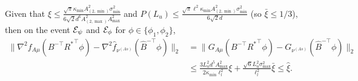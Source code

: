 \begin{lemma}
\label{lem:Binversenablavariation1}
Given that $\xi \le \frac{\sqrt{\pi}\kappa_{\min}A^2_{(2,\min)}\sigma_{\min}^2}{6\sqrt{2}d^6A_{(2,\max)}^2A_{\max}^2}$ and $P(L_u) \le \frac{\sqrt{\pi}\ell^2\kappa_{\min}A^2_{(2,\min)}\sigma_{\min}^2}{6\sqrt{2}d}$
(so $\bar{\xi} \le 1/3$), then on the event $\mathcal{E}_{\psi}$ and $\mathcal{E}_{\phi}$ for $\phi \in \{\phi_1, \phi_2\}$,
\begin{align*}
\|\nabla^2 f_{A\mu}(B^{-\top}{R^*}^{\top}\phi) - \nabla^2 \hat{f}_{\nu^{(As)}}(\hat{B}^{-\top}\phi)  \|_2 
 & = \|G_{A\mu}(B^{-\top}{R^*}^{\top}\phi) - G_{\nu^{(As)}}(\hat{B}^{-\top}\phi)\|_2\\
& \le 
\frac{3L_u^2d^5A^2_{\max}}{2\kappa_{\min}\ell_l^2}\xi + \frac{\sqrt{6}L_u^2\sigma_{\max}^2}{\ell_l^2}\bar{\xi}
\le \hat{\xi}.
\end{align*}
\end{lemma}
